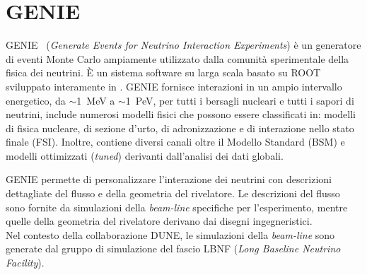 \documentclass[../main.tex]{subfiles}
\begin{document}
\section{GENIE} \label{sec:genie}
  GENIE~\cite{Andreopoulos_2010}
  (\textit{Generate Events for Neutrino Interaction Experiments}) è un
  generatore di eventi Monte Carlo ampiamente utilizzato dalla comunità
  sperimentale della fisica dei neutrini.
  È un sistema software su larga scala basato su ROOT sviluppato
  interamente in \CPP.
  GENIE fornisce interazioni in un ampio intervallo energetico, da $\sim$1~MeV
  a $\sim$1~PeV, per tutti i bersagli nucleari e tutti i sapori di neutrini,
  include numerosi modelli fisici che possono essere classificati in: modelli di
  fisica nucleare, di sezione d'urto, di adronizzazione e di interazione nello
  stato finale (FSI). Inoltre, contiene diversi canali oltre il Modello Standard
  (BSM) e modelli ottimizzati (\textit{tuned}) derivanti dall'analisi dei dati
  globali.

  GENIE permette di personalizzare l'interazione dei neutrini con descrizioni
  dettagliate del flusso e della geometria del rivelatore.
  Le descrizioni del flusso sono fornite da simulazioni della
  \textit{beam-line} specifiche per l'esperimento, mentre quelle della
  geometria del rivelatore derivano dai disegni ingegneristici.\\
  Nel contesto della collaborazione DUNE, le simulazioni della
  \textit{beam-line} sono generate dal gruppo di simulazione del fascio
  LBNF (\textit{Long Baseline Neutrino Facility}).
\end{document}
